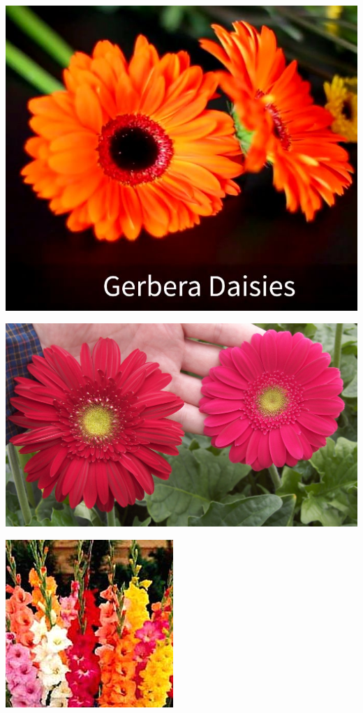 \documentclass{article}
\begin{document}
\begin{center}
\includegraphics[height=0.925\paperheight]{../Gerbera_Daisies.jpg}
\end{center}
\newpage

\begin{center}
\includegraphics[height=0.925\paperheight]{../Gerbera_PassionMaya.jpg}
\end{center}
\newpage

\begin{center}
\includegraphics[height=0.925\paperheight]{../Gladiolous.jpg}
\end{center}
\newpage
\end{document}
